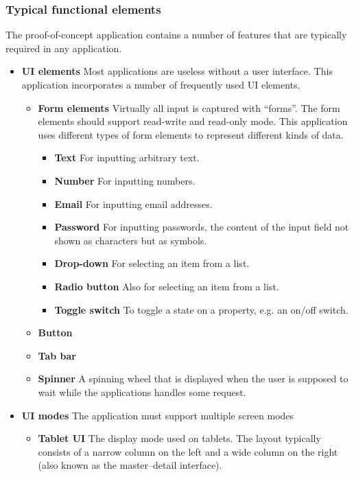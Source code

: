 \subsubsection{Typical functional elements}

The proof-of-concept application contains a number of features that are typically required in any application.

\begin{itemize}
    \item \textbf{UI elements} Most applications are useless without a user interface. This application incorporates a number of frequently used UI elements.
    \begin{itemize}
        \item \textbf{Form elements} Virtually all input is captured with ``forms''. The form elements should support read-write and read-only mode. This application uses different types of form elements to represent different kinds of data. 
        \begin{itemize}
            \item \textbf{Text} For inputting arbitrary text.
            \item \textbf{Number} For inputting numbers.
            \item \textbf{Email} For inputting email addresses.
            \item \textbf{Password} For inputting passwords, the content of the input field not shown as characters but as symbols. 
            \item \textbf{Drop-down} For selecting an item from a list.
            \item \textbf{Radio button} Also for selecting an item from a list.
            \item \textbf{Toggle switch} To toggle a state on a property, e.g. an on/off switch.
        \end{itemize}
        \item \textbf{Button} 
        \item \textbf{Tab bar}  
        \item \textbf{Spinner} A spinning wheel that is displayed when the user is supposed to wait while the applications handles some request.
    \end{itemize}
    \item \textbf{UI modes} The application must support multiple screen modes
    \begin{itemize}
        \item \textbf{Tablet UI} The display mode used on tablets. The layout typically consists of a narrow column on the left and a wide column on the right (also known as the master--detail interface).

\end{itemize}
\end{itemize}
